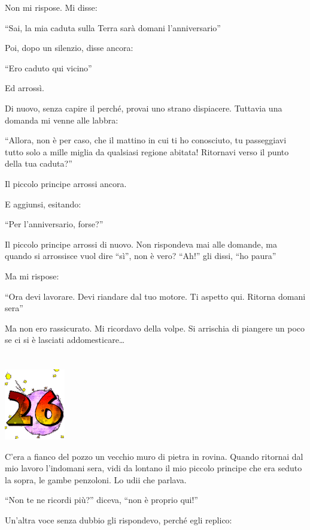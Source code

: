 \documentclass[11pt]{scrbook}
\begin{document}
Non mi rispose. Mi disse:

``Sai, la mia caduta sulla Terra sarà domani l'anniversario''

Poi, dopo un silenzio, disse ancora:

``Ero caduto qui vicino''

Ed arrossì.

Di nuovo, senza capire il perché, provai uno strano dispiacere. Tuttavia una domanda mi venne alle labbra:

``Allora, non è per caso, che il mattino in cui ti ho conosciuto, tu passeggiavi tutto solo a mille miglia da qualsiasi regione abitata! Ritornavi verso il punto della tua caduta?''

Il piccolo principe arrossi ancora.

E aggiunsi, esitando:

``Per l'anniversario, forse?''

Il piccolo principe arrossi di nuovo. Non rispondeva mai alle domande, ma quando si arrossisce vuol dire ``sì'', non è vero? ``Ah!'' gli dissi, ``ho paura''

Ma mi rispose:

``Ora devi lavorare. Devi riandare dal tuo motore. Ti aspetto qui. Ritorna domani sera''

Ma non ero rassicurato. Mi ricordavo della volpe. Si arrischia di piangere un poco se ci si è lasciati addomesticare\ldots{}

\chapter{}
\begin{center}
\includegraphics{img/chapter26}
\end{center}

C'era a fianco del pozzo un vecchio muro di pietra in rovina. Quando ritornai dal mio lavoro l'indomani sera, vidi da lontano il mio piccolo principe che era seduto la sopra, le gambe penzoloni. Lo udii che parlava.

``Non te ne ricordi più?'' diceva, ``non è proprio qui!''

Un'altra voce senza dubbio gli rispondevo, perché egli replico:
\end{document}
